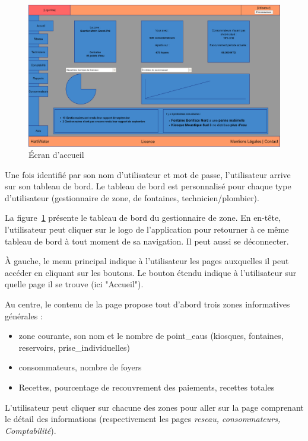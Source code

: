 \documentclass[a4paper, 11pt]{article}
\begin{document}
    \begin{figure}[H]
        \centering
        \includegraphics[width=.8\textwidth]{Cahier_des_Charges/accueil}
        \caption{\'Ecran d'accueil}
        \label{fig:zone_dashboard}
    \end{figure}

    Une fois identifié par son nom d'\gls{utilisateur} et mot de passe, l'\gls{utilisateur} arrive sur son tableau de bord. Le tableau de bord est personnalisé pour chaque type d'\gls{utilisateur} (gestionnaire de \gls{zone}, de \glspl{fontaine}, technicien/plombier).

    La figure~\ref{fig:zone_dashboard} présente le tableau de bord du gestionnaire de \gls{zone}. En en-tête, l'\gls{utilisateur} peut cliquer sur le logo de l'\gls{application} pour retourner à ce même tableau de bord à tout moment de sa navigation. Il peut aussi se déconnecter.

    À gauche, le menu principal indique à l'\gls{utilisateur} les pages auxquelles il peut accéder en cliquant sur les boutons. Le bouton étendu indique à l'\gls{utilisateur} sur quelle page il se trouve (ici "Accueil").

    Au centre, le contenu de la page propose tout d'abord trois \glspl{zone} informatives générales :
    \begin{itemize}
      \item \gls{zone} courante, son nom et le nombre de \glspl{point_eau} (kiosques, \glspl{fontaine}, \glspl{reservoir}, \glspl{prise_individuelle})
      \item \glspl{consommateur}, nombre de foyers
      \item Recettes, pourcentage de recouvrement des paiements, recettes totales
    \end{itemize}
    L'\gls{utilisateur} peut cliquer sur chacune des \glspl{zone} pour aller sur la page comprenant le détail des informations (respectivement les pages \emph{\gls{reseau}, \glspl{consommateur}, Comptabilité}).
\end{document}
